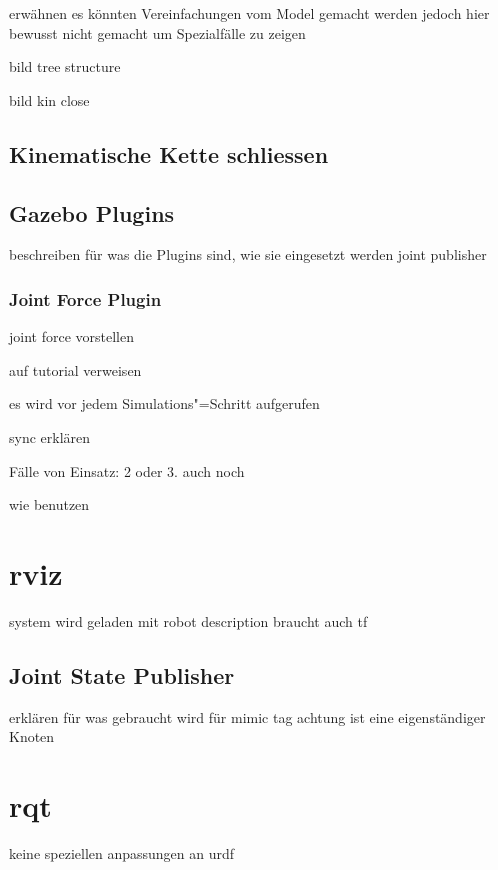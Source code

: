 erwähnen es könnten Vereinfachungen vom Model gemacht werden
jedoch hier bewusst nicht gemacht um Spezialfälle zu zeigen

bild tree structure

bild kin close

\subsection{Kinematische Kette schliessen}


\subsection{Gazebo Plugins}
beschreiben für was die Plugins sind, wie sie eingesetzt werden
joint publisher


\subsubsection{Joint Force Plugin}
joint force vorstellen

auf tutorial verweisen

es wird vor jedem Simulations"=Schritt aufgerufen

sync erklären

Fälle von Einsatz: 2 oder 3. auch noch

wie benutzen 


\section{rviz}
system wird geladen mit robot description
braucht auch tf

\subsection{Joint State Publisher}
erklären für was gebraucht wird
für mimic tag
achtung ist eine eigenständiger Knoten


\section{rqt}
keine speziellen anpassungen an urdf 



